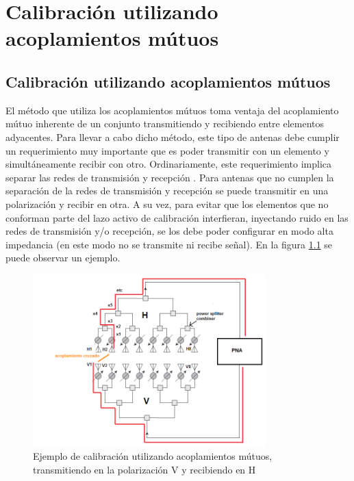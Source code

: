 \chapter{Calibración utilizando acoplamientos mútuos}
\label{ch:convertidores}

\section{Calibración utilizando acoplamientos mútuos}

El método que utiliza los acoplamientos mútuos toma ventaja del acoplamiento mútuo inherente de un conjunto transmitiendo 
y recibiendo entre elementos adyacentes. Para llevar a cabo dicho método, este tipo de antenas debe cumplir un 
requerimiento muy importante que es poder transmitir con un elemento y simultáneamente recibir con otro. 
Ordinariamente, este requerimiento implica separar las redes de transmisión y recepción \cite{Gao2001}. Para antenas que no 
cumplen la separación de la redes de transmisión y recepción se puede transmitir en una polarización y recibir en otra. A 
su vez, para evitar que los elementos que no conforman parte del lazo activo de calibración interfieran, inyectando ruido en 
las redes de transmisión y/o recepción, se los debe poder configurar en modo alta impedancia (en este modo no se transmite ni recibe señal). 
En la figura \ref{fig:mutual_general} se puede observar un ejemplo.

\begin{figure}[H]
 \centering
 \includegraphics[width=9cm]{gfx/mutualCouplingExample.png}
 \caption{Ejemplo de calibración utilizando acoplamientos mútuos, transmitiendo en la polarización V y recibiendo en H}
 \label{fig:mutual_general}
\end{figure}

